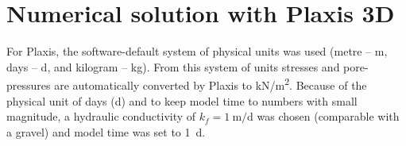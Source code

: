 

\section{Numerical solution with Plaxis 3D}
\label{fully-saturated-undrained-compression:sec:plaxis}

For Plaxis, the software-default system of physical units was used (metre --
\unit{\metre}, days -- \unit{\day}, and kilogram -- \unit{\kilogram}). From
this system of units stresses and pore-pressures are automatically converted by
Plaxis to \unit[per-mode = symbol]{\kilo\newton\per\square\metre}. Because of
the physical unit of days (\unit{\day}) and to keep model time to numbers with
small magnitude, a hydraulic conductivity of $k_f = \qty[per-mode =
        symbol]{1}{\metre\per\day}$ was chosen (comparable with a gravel) and model
time was set to \qty{1}{\day}.

